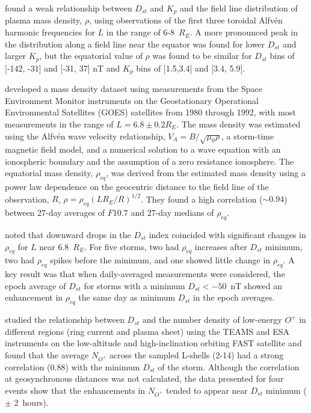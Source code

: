 \documentclass[draft,linenumbers]{agujournal}
\begin{document}
\citet{Denton2006} found a weak relationship between $D_{st}$ and $K_p$ and the field line distribution of plasma mass density, $\rho$, using observations of the first three toroidal Alfv\'en harmonic frequencies for $L$ in the range of 6-8~$R_E$.  A more pronounced peak in the distribution along a field line near the equator was found for lower $D_{st}$ and larger $K_p$, but the equatorial value of $\rho$ was found to be similar for $D_{st}$ bins of [-142, -31] and [-31, 37] nT and $K_p$ bins of [1.5,3.4] and [3.4, 5.9].

\citet{Takahashi2010} developed a mass density dataset using measurements from the Space Environment Monitor instruments on the Geostationary Operational Environmental Satellites (GOES) satellites from 1980 through 1992, with most measurements in the range of $L=6.8\pm0.2 R_E$. The mass density was estimated using the Alfv\'en wave velocity relationship, $V_A=B/\sqrt{\mu_0\rho}$, a storm-time magnetic field model, and a numerical solution to a wave equation with an ionospheric boundary and the assumption of a zero resistance ionosphere.  The equatorial mass density, $\rho_{eq}$, was derived from the estimated mass density using a power law dependence on the geocentric distance to the field line of the observation, $R$, $\rho=\rho_{eq}(LR_E/R)^{1/2}$.  They found a high correlation ($\sim 0.94$) between 27-day averages of $F10.7$ and 27-day medians of $\rho_{eq}$.

\citet{Takahashi2010} noted that downward drops in the $D_{st}$ index coincided with significant changes in $\rho_{eq}$ for $L$ near 6.8~$R_E$. For five storms, two had $\rho_{eq}$ increases after $D_{st}$ minimum, two had $\rho_{eq}$ spikes before the minimum, and one showed little change in $\rho_{eq}$.  A key result was that when daily-averaged measurements were considered, the epoch average of $D_{st}$ for storms with a minimum $D_{st} < -50$~nT showed an enhancement in $\rho_{eq}$ the same day as minimum $D_{st}$ in the epoch averages.

\citet{Yao2008} studied the relationship between $D_{st}$ and the number density of low-energy $O^+$ in different regions (ring current and plasma sheet) using the TEAMS and ESA instruments on the low-altitude and high-inclination orbiting FAST satellite and found that the average $N_{O^+}$ across the sampled L-shells (2-14) had a strong correlation (0.88) with the minimum $D_{st}$ of the storm.  Although the correlation at geosynchronous distances was not calculated, the data presented for four events show that the enhancements in $N_{O^+}$ tended to appear near $D_{st}$ minimum ($\pm$ 2~hours).
\end{document}
